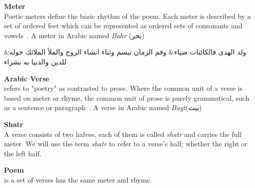 
    
\begin{definition}\label{def:meter}
  \textbf{Meter} \hfill \\
  Poetic meters define the basic rhythm of the poem. Each meter is described by a set of ordered feet which can be represented as ordered sets of consonants and vowels~\cite{Almuhareb2015}. A meter in Arabic named \textit{Bahr}   (\textarabic{بحر})
\begin{Arabic}
	\begin{traditionalpoem*}
          ولد الهدى فالكائنات ضياء\quad & \quad وفم الزمان تبسم وثناء انشاء
          الروح والملأ الملائك حوله\quad & \quad للدين والدنيا به بشراء

	\end{traditionalpoem*}
\end{Arabic}%
\end{definition}

\begin{definition}\label{def:verse}
  \textbf{Arabic Verse} \hfill \\ refers to "poetry" as contrasted to prose. Where the common unit of a verse is based on meter or rhyme, the common unit of prose is purely grammatical, such as a sentence or paragraph~\cite{Wiki_Verse}. A verse in Arabic named \textit{Bayt}(\textarabic{بيت})
\end{definition}

\begin{definition}\label{def:shatr}
  \textbf{Shatr} \hfill \\  A verse consists of two halves, each of them is called \textit{shatr} and carries the full meter.  We will use the term \textit{shatr} to refer to a verse's half; whether the right or the left half.
\end{definition}

\begin{definition}\label{def:poem}
  \textbf{Poem} \hfill \\  is a set of verses has the same meter and rhyme.
\end{definition}


